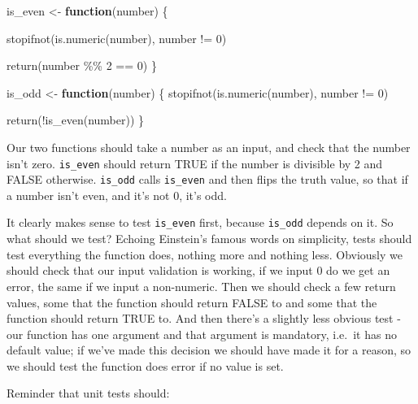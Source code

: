 \documentclass[
  letterpaper,
  DIV=11,
  numbers=noendperiod]{scrreprt}
\newenvironment{Shaded}{\begin{snugshade}}{\end{snugshade}}
\newcommand{\ControlFlowTok}[1]{\textcolor[rgb]{0.00,0.23,0.31}{\textbf{#1}}}
\newcommand{\DecValTok}[1]{\textcolor[rgb]{0.68,0.00,0.00}{#1}}
\newcommand{\FunctionTok}[1]{\textcolor[rgb]{0.28,0.35,0.67}{#1}}
\newcommand{\NormalTok}[1]{\textcolor[rgb]{0.00,0.23,0.31}{#1}}
\newcommand{\OtherTok}[1]{\textcolor[rgb]{0.00,0.23,0.31}{#1}}
\newcommand{\SpecialCharTok}[1]{\textcolor[rgb]{0.37,0.37,0.37}{#1}}
\begin{document}
\begin{Shaded}
\begin{Highlighting}[]
\NormalTok{is\_even }\OtherTok{\textless{}{-}} \ControlFlowTok{function}\NormalTok{(number) \{}
  
  \FunctionTok{stopifnot}\NormalTok{(}\FunctionTok{is.numeric}\NormalTok{(number), number }\SpecialCharTok{!=} \DecValTok{0}\NormalTok{)}
  
  \FunctionTok{return}\NormalTok{(number }\SpecialCharTok{\%\%} \DecValTok{2} \SpecialCharTok{==} \DecValTok{0}\NormalTok{)}
\NormalTok{\}}


\NormalTok{is\_odd }\OtherTok{\textless{}{-}} \ControlFlowTok{function}\NormalTok{(number) \{}
  \FunctionTok{stopifnot}\NormalTok{(}\FunctionTok{is.numeric}\NormalTok{(number), number }\SpecialCharTok{!=} \DecValTok{0}\NormalTok{)}
  
  \FunctionTok{return}\NormalTok{(}\SpecialCharTok{!}\FunctionTok{is\_even}\NormalTok{(number))}
\NormalTok{\}}
\end{Highlighting}
\end{Shaded}

Our two functions should take a number as an input, and check that the
number isn't zero. \texttt{is\_even} should return TRUE if the number is
divisible by 2 and FALSE otherwise. \texttt{is\_odd} calls
\texttt{is\_even} and then flips the truth value, so that if a number
isn't even, and it's not 0, it's odd.

It clearly makes sense to test \texttt{is\_even} first, because
\texttt{is\_odd} depends on it. So what should we test? Echoing
Einstein's famous words on simplicity, tests should test everything the
function does, nothing more and nothing less. Obviously we should check
that our input validation is working, if we input 0 do we get an error,
the same if we input a non-numeric. Then we should check a few return
values, some that the function should return FALSE to and some that the
function should return TRUE to. And then there's a slightly less obvious
test - our function has one argument and that argument is mandatory,
i.e.~it has no default value; if we've made this decision we should have
made it for a reason, so we should test the function does error if no
value is set.

Reminder that unit tests should:
\end{document}
